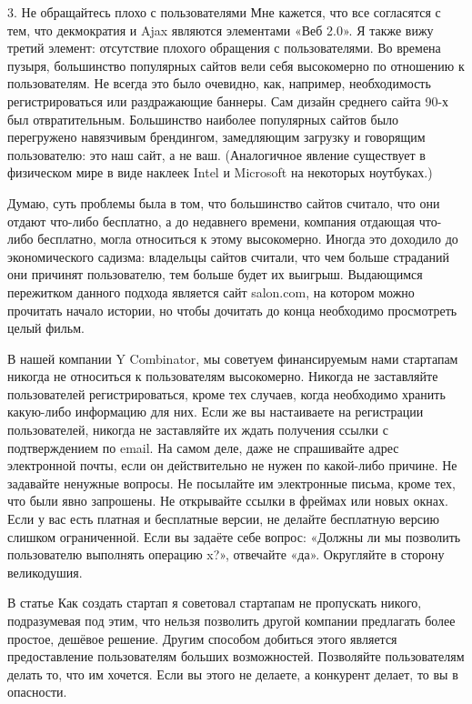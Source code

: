 \documentclass[ebook,12pt,oneside,openany]{memoir}
\begin{document}
3. Не обращайтесь плохо с пользователями Мне кажется, что все
согласятся с тем, что декмократия и Ajax являются элементами «Веб
2.0». Я также вижу третий элемент: отсутствие плохого обращения с
пользователями. Во времена пузыря, большинство популярных сайтов вели
себя высокомерно по отношению к пользователям. Не всегда это было
очевидно, как, например, необходимость регистрироваться или
раздражающие баннеры. Сам дизайн среднего сайта 90-х был
отвратительным. Большинство наиболее популярных сайтов было
перегружено навязчивым брендингом, замедляющим загрузку и говорящим
пользователю: это наш сайт, а не ваш. (Аналогичное явление существует
в физическом мире в виде наклеек Intel и Microsoft на некоторых
ноутбуках.)

Думаю, суть проблемы была в том, что большинство сайтов считало, что
они отдают что-либо бесплатно, а до недавнего времени, компания
отдающая что-либо бесплатно, могла относиться к этому высокомерно.
Иногда это доходило до экономического садизма: владельцы сайтов
считали, что чем больше страданий они причинят пользователю, тем
больше будет их выигрыш. Выдающимся пережитком данного подхода
является сайт salon.com, на котором можно прочитать начало истории, но
чтобы дочитать до конца необходимо просмотреть целый фильм.

В нашей компании Y Combinator, мы советуем финансируемым нами
стартапам никогда не относиться к пользователям высокомерно. Никогда
не заставляйте пользователей регистрироваться, кроме тех случаев,
когда необходимо хранить какую-либо информацию для них. Если же вы
настаиваете на регистрации пользователей, никогда не заставляйте их
ждать получения ссылки с подтверждением по email. На самом деле, даже
не спрашивайте адрес электронной почты, если он действительно не нужен
по какой-либо причине. Не задавайте ненужные вопросы. Не посылайте им
электронные письма, кроме тех, что были явно запрошены. Не открывайте
ссылки в фреймах или новых окнах. Если у вас есть платная и бесплатные
версии, не делайте бесплатную версию слишком ограниченной. Если вы
задаёте себе вопрос: «Должны ли мы позволить пользователю выполнять
операцию x?», отвечайте «да». Округляйте в сторону великодушия.

В статье Как создать стартап я советовал стартапам не пропускать
никого, подразумевая под этим, что нельзя позволить другой компании
предлагать более простое, дешёвое решение. Другим способом добиться
этого является предоставление пользователям больших возможностей.
Позволяйте пользователям делать то, что им хочется. Если вы этого не
делаете, а конкурент делает, то вы в опасности.
\end{document}
